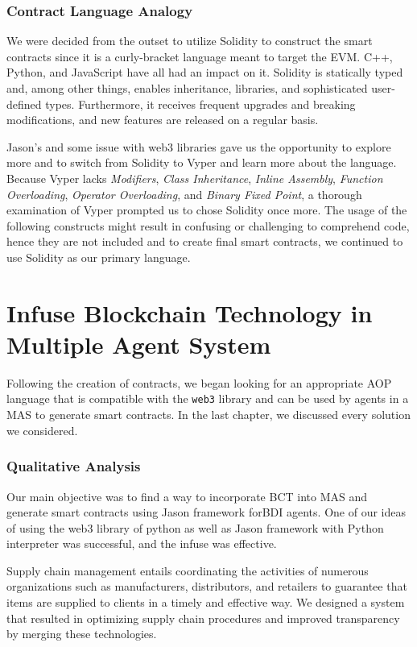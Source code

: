 \subsubsection{Contract Language Analogy}

We were decided from the outset to utilize Solidity to construct the smart contracts since it is a curly-bracket language meant to target the \ac{EVM}. C++, Python, and JavaScript have all had an impact on it. Solidity is statically typed and, among other things, enables inheritance, libraries, and sophisticated user-defined types. Furthermore, it receives frequent upgrades and breaking modifications, and new features are released on a regular basis. 

\vspace{.5cm}

Jason's and some issue with web3 libraries gave us the opportunity to explore more and to switch from Solidity to Vyper and learn more about the language. Because Vyper lacks \textit{Modifiers}, \textit{Class Inheritance}, \textit{Inline Assembly}, \textit{Function Overloading}, \textit{Operator Overloading}, and \textit{Binary Fixed Point}, a thorough examination of Vyper prompted us to chose Solidity once more. The usage of the following constructs might result in confusing or challenging to comprehend code, hence they are not included and to create final smart contracts, we continued to use Solidity as our primary language.


\section{Infuse Blockchain Technology in Multiple Agent System}

Following the creation of contracts, we began looking for an appropriate \ac{AOP} language that is compatible with the \texttt{web3} library and can be used by agents in a \ac{MAS} to generate smart contracts. In the last chapter, we discussed every solution we considered. 

\subsubsection{Qualitative Analysis}
Our main objective was to find a way to incorporate \ac{BCT} into \ac{MAS} and generate smart contracts using Jason framework for\ac{BDI} agents. One of our ideas of using the web3 library of python as well as Jason framework with Python interpreter was successful, and the infuse was effective.

Supply chain management entails coordinating the activities of numerous organizations such as manufacturers, distributors, and retailers to guarantee that items are supplied to clients in a timely and effective way. We designed a system that resulted in optimizing supply chain procedures and improved transparency by merging these technologies.